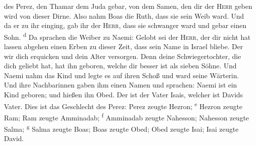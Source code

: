 des Perez, den Thamar dem Juda gebar, von dem Samen, den dir der
\textsc{Herr} geben wird von dieser Dirne.  Also nahm
Boas die Ruth, dass sie sein Weib ward. Und da er zu ihr einging, gab
ihr der \textsc{Herr}, dass sie schwanger ward und gebar einen Sohn.
\textsuperscript{d}  Da sprachen die Weiber zu Naemi:
Gelobt sei der \textsc{Herr}, der dir nicht hat lassen abgehen einen
Erben zu dieser Zeit, dass sein Name in Israel bliebe. 
Der wir dich erquicken und dein Alter versorgen. Denn deine
Schwiegertochter, die dich geliebt hat, hat ihn geboren, welche dir
besser ist als sieben Söhne.  Und Naemi nahm das Kind und
legte es auf ihren Schoß und ward seine Wärterin.  Und
ihre Nachbarinnen gaben ihm einen Namen und sprachen: Naemi ist ein Kind
geboren; und hießen ihn Obed. Der ist der Vater Isais, welcher ist
Davids Vater.  Dies ist das Geschlecht des Perez: Perez
zeugte Hezron; \textsuperscript{e}  Hezron zeugte Ram;
Ram zeugte Amminadab; \textsuperscript{f}  Amminadab
zeugte Nahesson; Nahesson zeugte Salma; \textsuperscript{g}
 Salma zeugte Boas; Boas zeugte Obed; 
Obed zeugte Isai; Isai zeugte David.
